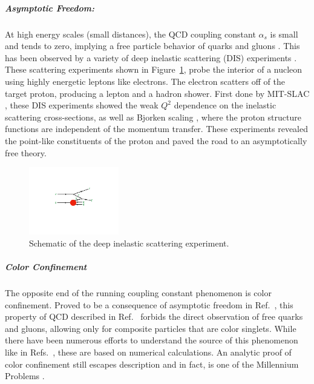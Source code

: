 \subparagraph{Asymptotic Freedom: }
At high energy scales (small distances), the QCD coupling constant $\alpha_s$ is small and tends to zero, implying a free particle behavior of quarks and gluons \cite{PhysRevLett.30.1343, PhysRevD.8.3633}.
This has been observed by a variety of deep inelastic scattering (DIS) experiments \cite{Deur:2014vea, Kim:1998kia, Altarelli:1996nm, RevModPhys.63.597, Kataev:2001kk, Alekhin:2012ig, Alekhin:2013nua, Blumlein:2006be, Aaron:2007xx, Chekanov:2007pa, Chekanov:2008af, Abramowicz:2010cka, Abramowicz:2010ke, Aaron:2009vs}.
These scattering experiments shown in Figure~\ref{fig:dis_schematic}, probe the interior of a nucleon using highly energetic leptons like electrons.
The electron scatters off of the target proton, producing a lepton and a hadron shower.
First done by MIT-SLAC \cite{PhysRevLett.23.930, PhysRevLett.23.935}, these DIS experiments showed the weak $Q^2$ dependence on the inelastic scattering cross-sections, as well as Bjorken scaling \cite{PhysRev.179.1547}, where the proton structure functions are independent of the momentum transfer.
These experiments revealed the point-like constituents of the proton and paved the road to an asymptotically free theory.

\begin{figure}[htbp]
\begin{center}
\includegraphics[width=0.35\textwidth]{figures/theory/DIS}
\caption{Schematic of the deep inelastic scattering experiment.}
\label{fig:dis_schematic}
\end{center}
\end{figure}


\subparagraph{Color Confinement}
The opposite end of the running coupling constant phenomenon is color confinement.
Proved to be a consequence of asymptotic freedom in Ref.~\cite{Nishijima1996}, this property of QCD described in Ref.~\cite{PhysRevD.10.2445} forbids the direct observation of free quarks and gluons, allowing only for composite particles that are color singlets.
While there have been numerous efforts to understand the source of this phenomenon like in Refs.~\cite{BUCHMULLER1982479, KOGUT1976199, PhysRevD.31.2910, PhysRevD.57.2603, PhysRevD.62.114503, RevModPhys.55.775, PhysRevLett.90.102001}, these are based on numerical calculations.
An analytic proof of color confinement still escapes description and in fact, is one of the Millennium Problems \cite{MillenniumProb}.


